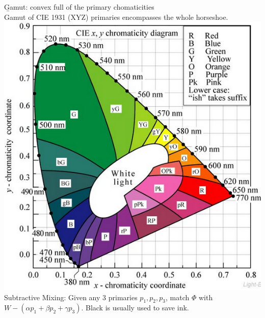 \documentclass[3pt,landscape]{article}
\begin{document}
\begin{multicols}{3}
{\b Gamut}: convex full of the primary chomaticities\\
Gamut of CIE 1931 (XYZ) primaries encompasses the whole horseshoe.\\
\includegraphics[scale=0.4]{images/gamut}\\
Subtractive Mixing: Given any 3 primaries \(p_1,p_2,p_3\), match \(\Phi\) with \(W-(\alpha p_1 + \beta p_2 + \gamma p_3)\). Black is usually used to save ink.\\


\end{multicols}
\end{document}
